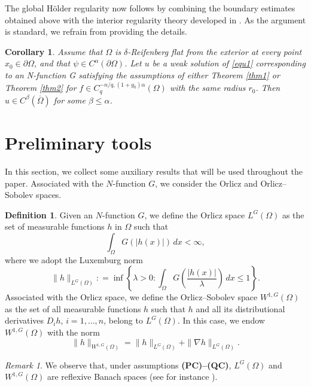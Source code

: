 \documentclass[11pt, leqno]{article}
\newtheorem{corollary}[theorem]{Corollary}
\theoremstyle{definition}
\newtheorem{definition}[theorem]{Definition}
\theoremstyle{remark}
\newtheorem{remark}[theorem]{Remark}
\numberwithin{equation}{section}
\newcommand{\defeq}{\mathrel{\mathop:}=}
\begin{document}
The global Hölder regularity now follows by combining the boundary estimates obtained above with the interior regularity theory developed in \cite{Lieb}. As the argument is standard, we refrain from providing the details.
\begin{corollary}
Assume that \(\Omega\) is \(\delta\)-Reifenberg flat from the exterior at every point \(x_0\in\partial\Omega\), and that \(\psi\in C^\alpha(\partial\Omega)\). Let \(u\) be a weak solution of \eqref{equ1} corresponding to an N-function G satisfying the assumptions of either Theorem \ref{thm1} or Theorem \ref{thm2} for
$f\in C_q^{-n/q,(1+g_0)\alpha}(\Omega)$ with the same radius \(r_0\). Then
$u\in C^\beta(\overline{\Omega})$ for some \(\beta\leq \alpha\).
\end{corollary}



\section{Preliminary tools}\label{Sec2}

In this section, we collect some auxiliary results that will be used throughout the paper. 
Associated with the $N$-function $G$, we consider the Orlicz and Orlicz--Sobolev spaces.

\begin{definition}
Given an $N$-function $G$, we define the Orlicz space $L^{G}(\Omega)$ as the set of measurable functions $h$ in $\Omega$ such that
\[
\int_{\Omega}G(|h(x)|)\,dx<\infty,
\]
where we adopt the Luxemburg norm
\[
\|h\|_{L^{G}(\Omega)}\defeq\inf\left\{\lambda>0:\int_\Omega G\left(\frac{|h(x)|}{\lambda}\right)\,dx\leq 1\right\}.
\]
Associated with the Orlicz space, we define the Orlicz--Sobolev space $W^{1,G}(\Omega)$ as the set of all measurable functions $h$ such that $h$ and all its distributional derivatives $D_{i}h$, $i=1,\ldots,n$, belong to $L^{G}(\Omega)$. In this case, we endow $W^{1,G}(\Omega)$ with the norm
\[
\|h\|_{W^{1,G}(\Omega)}=\|h\|_{L^{G}(\Omega)}+\|\nabla h\|_{L^{G}(\Omega)}.
\]
\end{definition}

\begin{remark}
We observe that, under assumptions {\bf (PC)--(QC)}, $L^{G}(\Omega)$ and $W^{1,G}(\Omega)$ are reflexive Banach spaces (see for instance \cite{HarHas19}).
\end{remark}
\end{document}
